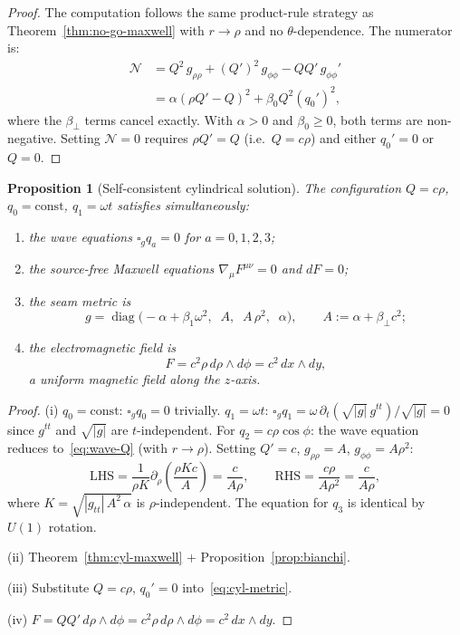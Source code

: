 \documentclass[pdflatex,sn-mathphys-num]{sn-jnl}
\theoremstyle{thmstyleone}%
\newtheorem{proposition}[theorem]{Proposition}
\theoremstyle{thmstyletwo}%
\theoremstyle{thmstylethree}%
\newcommand{\pa}{\partial}
\newcommand{\nn}{\nabla}
\numberwithin{equation}{section}
\begin{document}
\begin{proof}
The computation follows the same product-rule strategy as
Theorem~\ref{thm:no-go-maxwell} with $r\to\rho$ and no
$\theta$-dependence.  The numerator is:
\begin{align*}
\mathcal{N}
&= Q^2\,g_{\rho\rho} + (Q')^2\,g_{\phi\phi} - QQ'\,g_{\phi\phi}'
\\
&= \alpha(\rho Q' - Q)^2 + \beta_0 Q^2(q_0')^2,
\end{align*}
where the $\beta_\perp$ terms cancel exactly.  With $\alpha > 0$
and $\beta_0 \ge 0$, both terms are non-negative.  Setting
$\mathcal{N} = 0$ requires $\rho Q' = Q$ (i.e.\ $Q = c\rho$) and
either $q_0' = 0$ or $Q = 0$.
\end{proof}

\begin{proposition}[Self-consistent cylindrical solution]
\label{prop:cyl-solution}
The configuration $Q = c\rho$, $q_0 = \mathrm{const}$,
$q_1 = \omega t$ satisfies simultaneously:
\begin{enumerate}[noitemsep,label=(\roman*)]
\item the wave equations $\square_g q_a = 0$ for $a = 0,1,2,3$;
\item the source-free Maxwell equations $\nn_\mu F^{\mu\nu} = 0$
  and $dF = 0$;
\item the seam metric is
\begin{equation}
\label{eq:cyl-solution-metric}
g = \operatorname{diag}\!\bigl(
  -\alpha+\beta_1\omega^2,\;\;
  A,\;\;
  A\,\rho^2,\;\;
  \alpha
\bigr),
\qquad
A := \alpha + \beta_\perp c^2;
\end{equation}
\item the electromagnetic field is
\begin{equation}
\label{eq:cyl-F}
F = c^2\rho\,d\rho\wedge d\phi
  = c^2\,dx\wedge dy,
\end{equation}
a uniform magnetic field along the $z$-axis.
\end{enumerate}
\end{proposition}

\begin{proof}
(i) $q_0 = \mathrm{const}$: $\square_g q_0 = 0$ trivially.
$q_1 = \omega t$: $\square_g q_1
= \omega\,\pa_t(\sqrt{|g|}\,g^{tt})/\sqrt{|g|} = 0$ since $g^{tt}$
and $\sqrt{|g|}$ are $t$-independent.
For $q_2 = c\rho\cos\phi$: the wave equation reduces
to~\eqref{eq:wave-Q} (with $r\to\rho$).  Setting
$Q' = c$, $g_{\rho\rho} = A$, $g_{\phi\phi} = A\rho^2$:
\[
\text{LHS} = \frac{1}{\rho K}\pa_\rho\!\left(\frac{\rho K c}{A}\right)
= \frac{c}{A\rho},
\qquad
\text{RHS} = \frac{c\rho}{A\rho^2} = \frac{c}{A\rho},
\]
where $K = \sqrt{|g_{tt}|\,A^2\,\alpha}$ is $\rho$-independent.
The equation for $q_3$ is identical by $U(1)$ rotation.

(ii) Theorem~\ref{thm:cyl-maxwell} + Proposition~\ref{prop:bianchi}.

(iii) Substitute $Q = c\rho$, $q_0' = 0$
into~\eqref{eq:cyl-metric}.

(iv) $F = QQ'\,d\rho\wedge d\phi = c^2\rho\,d\rho\wedge d\phi
= c^2\,dx\wedge dy$.
\end{proof}
\end{document}

